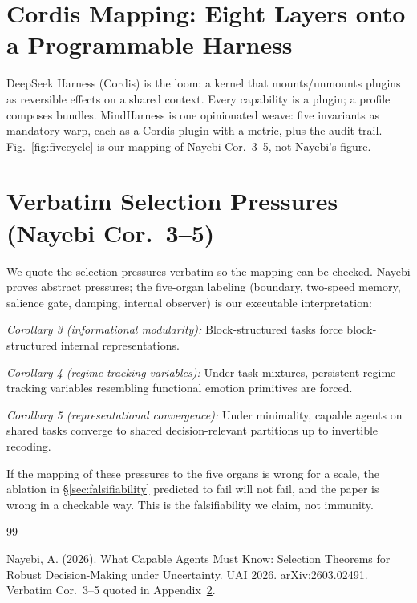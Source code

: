 \documentclass[11pt]{article}
\begin{document}
{\appendix
\section{Cordis Mapping: Eight Layers onto a Programmable Harness}
\label{app:cordis}

DeepSeek Harness (Cordis) is the loom: a kernel that mounts/unmounts plugins as reversible effects on a shared context. Every capability is a plugin; a profile composes bundles. MindHarness is one opinionated weave: five invariants as mandatory warp, each as a Cordis plugin with a metric, plus the audit trail. Fig.~\ref{fig:fivecycle} is our mapping of Nayebi Cor.~3--5, not Nayebi's figure.

\section{Verbatim Selection Pressures (Nayebi Cor.~3--5)}
\label{app:nayebi}

We quote the selection pressures verbatim so the mapping can be checked. Nayebi proves abstract pressures; the five-organ labeling (boundary, two-speed memory, salience gate, damping, internal observer) is our executable interpretation:

\textit{Corollary 3 (informational modularity):} Block-structured tasks force block-structured internal representations.

\textit{Corollary 4 (regime-tracking variables):} Under task mixtures, persistent regime-tracking variables resembling functional emotion primitives are forced.

\textit{Corollary 5 (representational convergence):} Under minimality, capable agents on shared tasks converge to shared decision-relevant partitions up to invertible recoding.

If the mapping of these pressures to the five organs is wrong for a scale, the ablation in \S\ref{sec:falsifiability} predicted to fail will not fail, and the paper is wrong in a checkable way. This is the falsifiability we claim, not immunity.


\begin{thebibliography}{99}

Nayebi, A. (2026). What Capable Agents Must Know: Selection Theorems for Robust Decision-Making under Uncertainty. UAI 2026. arXiv:2603.02491. Verbatim Cor.~3--5 quoted in Appendix~\ref{app:nayebi}.


\end{thebibliography}}
\end{document}
